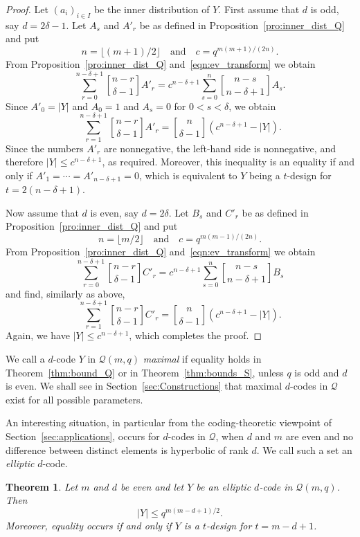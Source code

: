 \documentclass[10pt]{article}
\newtheorem{theorem}{Theorem}[section]
\theoremstyle{definition}
\newcommand{\Q}{\mathscr{Q}}
\renewcommand{\d}{\delta}
\newcommand{\abs}[1]{\lvert#1\rvert}
\begin{document}
\begin{proof}
Let $(a_i)_{i\in I}$ be the inner distribution of $Y$. First assume that $d$ is odd, say $d=2\d-1$. Let $A_s$ and $A'_r$ be as defined in Proposition~\ref{pro:inner_dist_Q} and put
\[
n=\lfloor (m+1)/2\rfloor\quad\text{and}\quad c=q^{m(m+1)/(2n)}.
\]
From Proposition~\ref{pro:inner_dist_Q} and~\eqref{eqn:ev_transform} we obtain
\[
\sum_{r=0}^{n-\delta+1}\genfrac{[}{]}{0pt}{}{n-r}{\delta-1}A'_r=c^{n-\delta+1}\sum_{s=0}^n\genfrac{[}{]}{0pt}{}{n-s}{n-\delta+1}A_s.
\]
Since $A'_0=\abs{Y}$ and $A_0=1$ and $A_s=0$ for $0<s<\delta$, we obtain
\[
\sum_{r=1}^{n-\delta+1}\genfrac{[}{]}{0pt}{}{n-r}{\delta-1}A'_r=\genfrac{[}{]}{0pt}{}{n}{\delta-1}(c^{n-\delta+1}-\abs{Y}).
\]
Since the numbers $A'_r$ are nonnegative, the left-hand side is nonnegative, and therefore $\abs{Y}\le c^{n-\delta+1}$, as required. Moreover, this inequality is an equality if and only if $A'_1=\cdots=A'_{n-\d+1}=0$, which is equivalent to $Y$ being a $t$-design for $t=2(n-\d+1)$.
\par
Now assume that $d$ is even, say $d=2\delta$. Let $B_s$ and $C'_r$ be as defined in Proposition~\ref{pro:inner_dist_Q} and put
\[
n=\lfloor m/2\rfloor\quad\text{and}\quad c=q^{m(m-1)/(2n)}.
\]
From Proposition~\ref{pro:inner_dist_Q} and~\eqref{eqn:ev_transform} we obtain
\[
\sum_{r=0}^{n-\delta+1}\genfrac{[}{]}{0pt}{}{n-r}{\delta-1}C'_r=c^{n-\delta+1}\sum_{s=0}^n\genfrac{[}{]}{0pt}{}{n-s}{n-\delta+1}B_s
\]
and find, similarly as above,
\[
\sum_{r=1}^{n-\delta+1}\genfrac{[}{]}{0pt}{}{n-r}{\delta-1}C'_r=
\genfrac{[}{]}{0pt}{}{n}{\delta-1}(c^{n-\delta+1}-\abs{Y}).
\]
Again, we have $\abs{Y}\le c^{n-\delta+1}$, which completes the proof.
\end{proof}
\par
We call a $d$-code $Y$ in $\Q(m,q)$ \emph{maximal} if equality holds in Theorem~\ref{thm:bound_Q} or in Theorem~\ref{thm:bounds_S}, unless $q$ is odd and $d$ is even. We shall see in Section~\ref{sec:Constructions} that maximal $d$-codes in $\Q$ exist for all possible parameters. 
\par
An interesting situation, in particular from the coding-theoretic viewpoint of Section~\ref{sec:applications}, occurs for $d$-codes in $\Q$, when $d$ and $m$ are even and no difference between distinct elements is hyperbolic of rank $d$. We call such a set an \emph{elliptic} $d$-code.
\begin{theorem}
\label{thm:bound_elliptic_Q}
Let $m$ and $d$ be even and let $Y$ be an elliptic $d$-code in $\Q(m,q)$. Then
\[
\abs{Y}\le q^{m(m-d+1)/2}.
\]
Moreover, equality occurs if and only if $Y$ is a $t$-design for $t=m-d+1$.
\end{theorem}
\end{document}
